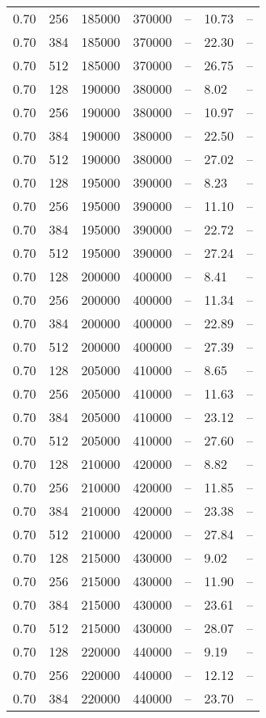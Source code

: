 \begin{tabular}{l|l|l|l|l|l|l}
0.70 & 256 & 185000 & 370000 & -- & 10.73 & --\\
0.70 & 384 & 185000 & 370000 & -- & 22.30 & --\\
0.70 & 512 & 185000 & 370000 & -- & 26.75 & --\\
0.70 & 128 & 190000 & 380000 & -- &  8.02 & --\\
0.70 & 256 & 190000 & 380000 & -- & 10.97 & --\\
0.70 & 384 & 190000 & 380000 & -- & 22.50 & --\\
0.70 & 512 & 190000 & 380000 & -- & 27.02 & --\\
0.70 & 128 & 195000 & 390000 & -- &  8.23 & --\\
0.70 & 256 & 195000 & 390000 & -- & 11.10 & --\\
0.70 & 384 & 195000 & 390000 & -- & 22.72 & --\\
0.70 & 512 & 195000 & 390000 & -- & 27.24 & --\\
0.70 & 128 & 200000 & 400000 & -- &  8.41 & --\\
0.70 & 256 & 200000 & 400000 & -- & 11.34 & --\\
0.70 & 384 & 200000 & 400000 & -- & 22.89 & --\\
0.70 & 512 & 200000 & 400000 & -- & 27.39 & --\\
0.70 & 128 & 205000 & 410000 & -- &  8.65 & --\\
0.70 & 256 & 205000 & 410000 & -- & 11.63 & --\\
0.70 & 384 & 205000 & 410000 & -- & 23.12 & --\\
0.70 & 512 & 205000 & 410000 & -- & 27.60 & --\\
0.70 & 128 & 210000 & 420000 & -- &  8.82 & --\\
0.70 & 256 & 210000 & 420000 & -- & 11.85 & --\\
0.70 & 384 & 210000 & 420000 & -- & 23.38 & --\\
0.70 & 512 & 210000 & 420000 & -- & 27.84 & --\\
0.70 & 128 & 215000 & 430000 & -- &  9.02 & --\\
0.70 & 256 & 215000 & 430000 & -- & 11.90 & --\\
0.70 & 384 & 215000 & 430000 & -- & 23.61 & --\\
0.70 & 512 & 215000 & 430000 & -- & 28.07 & --\\
0.70 & 128 & 220000 & 440000 & -- &  9.19 & --\\
0.70 & 256 & 220000 & 440000 & -- & 12.12 & --\\
0.70 & 384 & 220000 & 440000 & -- & 23.70 & --\\

\end{tabular}
